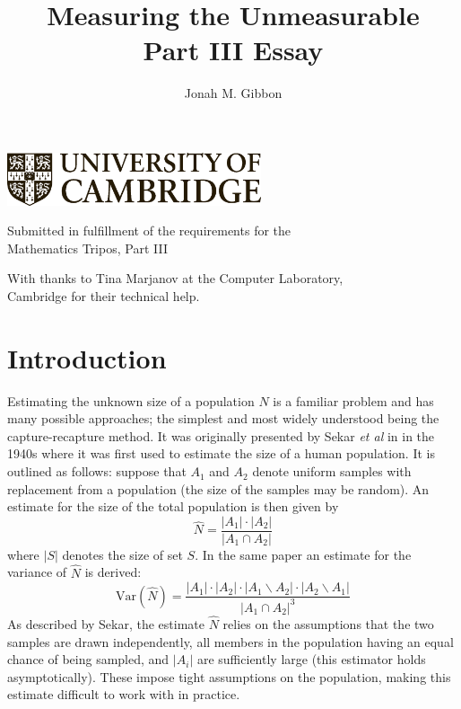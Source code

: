 \documentclass[10pt,a4paper,notitlepage]{article}
\author{Jonah M. Gibbon}
\title{\Huge Measuring the Unmeasurable \\ \vspace{0.4cm}  \huge Part III Essay}
\newcommand{\abs}[1]{\lvert#1\rvert}
\newcommand{\course}{Mathematics Tripos, Part III}
\begin{document}
\begin{titlepage}
\makeatletter

\includegraphics[width=75mm]{ucam-logo-bw}

\begin{center}
\huge
\vspace{\fill}

\@title
\vspace{\fill}



\end{center}


\vspace{\fill}
\begin{center}
Submitted in fulfillment of the requirements for the\\
\course
\end{center}

\makeatother
\end{titlepage}


\begin{center}
With thanks to Tina Marjanov at the Computer Laboratory, \\Cambridge for their technical help.
\end{center}
\tableofcontents
\pagebreak
\section{Introduction}
Estimating the unknown size of a population $N$ is a familiar problem and has many possible approaches; the simplest and most widely understood being the capture-recapture method. It was originally presented by Sekar \textit{et al} in \cite{Sekar} in the 1940s where it was first used to estimate the size of a human population.  It is outlined as follows: suppose that $A_{1}$ and $A_{2}$ denote uniform samples with replacement from a population (the size of the samples may be random). An estimate for the size of the total population is then given by
\begin{equation}
\hat{N}=\frac{\abs{A_{1}}\cdot \abs{A_{2}}}{\abs{A_{1}\cap A_{2}}}
\end{equation}
where $\abs{S}$ denotes the size of set $S$. In the same paper an estimate for the variance of $\hat{N}$ is derived:
\begin{equation}
\text{Var}\left(\hat{N}\right)=\frac{\abs{A_{1}}\cdot\abs{A_{2}}\cdot\abs{A_{1}\backslash A_{2}}\cdot\abs{A_{2}\backslash A_{1}}}{\abs{A_{1}\cap A_{2}}^{3}}
\end{equation}
As described by Sekar, the estimate $\hat{N}$ relies on the assumptions that the two samples are drawn independently,  all members in the population having an equal chance of being sampled, and $\abs{A_{i}}$ are sufficiently large (this estimator holds asymptotically). These impose tight assumptions on the population, making this estimate difficult to work with in practice. 
\end{document}
